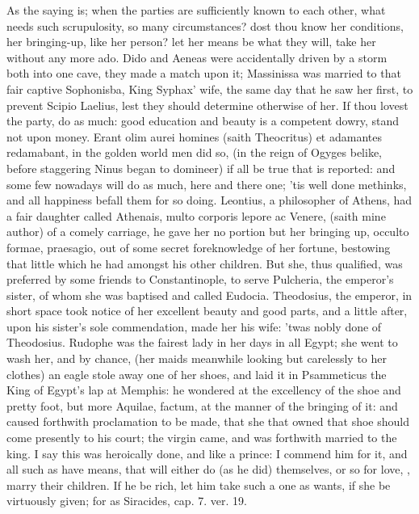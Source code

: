 {As the saying is; when the parties are sufficiently known to each
other, what needs such scrupulosity, so many circumstances? dost thou
know her conditions, her bringing-up, like her person? let her means be
what they will, take her without any more ado. Dido and Aeneas
were accidentally driven by a storm both into one cave, they made a
match upon it; Massinissa was married to that fair captive Sophonisba,
King Syphax' wife, the same day that he saw her first, to prevent
Scipio Laelius, lest they should determine otherwise of her. If thou
lovest the party, do as much: good education and beauty is a competent
dowry, stand not upon money. Erant olim aurei homines (saith
Theocritus) et adamantes redamabant, in the golden world men did so,
(in the reign of Ogyges belike, before staggering Ninus began to
domineer) if all be true that is reported: and some few nowadays will
do as much, here and there one; 'tis well done methinks, and all
happiness befall them for so doing. Leontius, a philosopher of
Athens, had a fair daughter called Athenais, multo corporis lepore ac
Venere, (saith mine author) of a comely carriage, he gave her no
portion but her bringing up, occulto formae, praesagio, out of some
secret foreknowledge of her fortune, bestowing that little which he had
amongst his other children. But she, thus qualified, was preferred by
some friends to Constantinople, to serve Pulcheria, the emperor's
sister, of whom she was baptised and called Eudocia. Theodosius, the
emperor, in short space took notice of her excellent beauty and good
parts, and a little after, upon his sister's sole commendation, made
her his wife: 'twas nobly done of Theodosius. Rudophe was the
fairest lady in her days in all Egypt; she went to wash her, and by
chance, (her maids meanwhile looking but carelessly to her clothes) an
eagle stole away one of her shoes, and laid it in Psammeticus the King
of Egypt's lap at Memphis: he wondered at the excellency of the shoe
and pretty foot, but more Aquilae, factum, at the manner of the
bringing of it: and caused forthwith proclamation to be made, that she
that owned that shoe should come presently to his court; the virgin
came, and was forthwith married to the king. I say this was heroically
done, and like a prince: I commend him for it, and all such as have
means, that will either do (as he did) themselves, or so for love, \etc{},
marry their children. If he be rich, let him take such a one as wants,
if she be virtuously given; for as Siracides, cap. 7. ver. 19.
}
